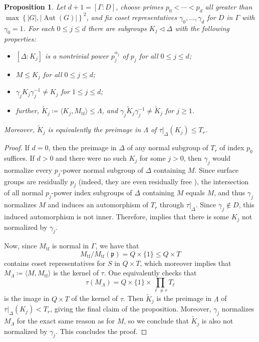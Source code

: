 \documentclass[11pt]{article}
\theoremstyle{plain}
\newtheorem{prop}[thm]{Proposition}
\theoremstyle{definition}
\theoremstyle{remark}
\newcommand{\frakp}{\mathfrak{p}}
\newcommand{\al}{\alpha}
\newcommand{\gam}{\gamma}
\newcommand{\Gam}{\Gamma}
\newcommand{\Del}{\Delta}
\newcommand{\Lam}{\Lambda}
\DeclareMathOperator{\Aut}{Aut}
\newcommand{\wt}{\widetilde}
\newenvironment{pf}{\begin{proof}}{\end{proof}}
\begin{document}
\begin{prop}\label{prop:ChoosepSubgps}
Let $d+1 = [\Gam : D]$, choose primes $p_0 < \cdots < p_d$ all greater than $\max\!\left\{|G|, |\Aut(G)|\right\}^2$, and fix coset representatives $\gam_0, \dots, \gam_d$ for $D$ in $\Gam$ with $\gam_0 = 1$. For each $0 \le j \le d$ there are subgroups $K_j \triangleleft \Del$ with the following properties:
\begin{itemize}

\item[$\star$] $[\Del : K_j]$ is a nontrivial power $p_j^{\al_j}$ of $p_j$ for all $0 \le j \le d$;

\item[$\star$] $M \le K_j$ for all $0 \le j \le d$;

\item[$\star$] $\gam_j K_j \gam_j^{-1} \neq K_j$ for $1 \le j \le d$;

\item[$\star$] further, $\wt{K}_j \coloneqq \langle K_j, M_\mathrm{tf} \rangle \le \Lam$, and $\gam_j \wt{K}_j \gam_j^{-1} \neq \wt{K}_j$ for $j \ge 1$.

\end{itemize}
Moreover, $\wt{K}_j$ is equivalently the preimage in $\Lam$ of $\tau|_\Del(K_j) \le T_r$.
\end{prop}
\begin{pf}
If $d = 0$, then the preimage in $\Del$ of any normal subgroup of $T_r$ of index $p_0$ suffices. If $d > 0$ and there were no such $K_j$ for some $j > 0$, then $\gam_j$ would normalize every $p_j$-power normal subgroup of $\Del$ containing $M$. Since surface groups are residually $p_j$ (indeed, they are even residually free \cite[Thm.\ 1]{Baumslag}), the intersection of all normal $p_j$-power index subgroups of $\Del$ containing $M$ equals $M$, and thus $\gam_j$ normalizes $M$ and induces an automorphism of $T_r$ through $\tau|_\Del$. Since $\gam_j \notin D$, this induced automorphism is not inner. Therefore,  implies that there is some $K_j$ not normalized by $\gam_j$.

Now, since $M_\mathrm{tf}$ is normal in $\Gam$, we have that
\begin{equation}\label{eq:Mquo}
M_\mathrm{tf} / M_\mathrm{tf}(\frakp) = Q \times \{1\} \le Q \times T
\end{equation}
contains coset representatives for $S$ in $Q \times T$, which moreover implies that $M_\Lam \coloneqq \langle M, M_\mathrm{tf}\rangle$ is the kernel of $\tau$. One equivalently checks that
\begin{equation}\label{eq:LamM}
\tau(M_\Lam) = Q \times \{1\} \times \prod_{\ell \neq r} T_\ell
\end{equation}
is the image in $Q \times T$ of the kernel of $\tau$. Then $\wt{K}_j$ is the preimage in $\Lam$ of $\tau|_\Del(K_j) < T_r$, giving the final claim of the proposition. Moreover, $\gam_j$ normalizes $M_\Lam$ for the exact same reason as for $M$, so we conclude that $\wt{K}_j$ is also not normalized by $\gam_j$. This concludes the proof.
\end{pf}
\end{document}
